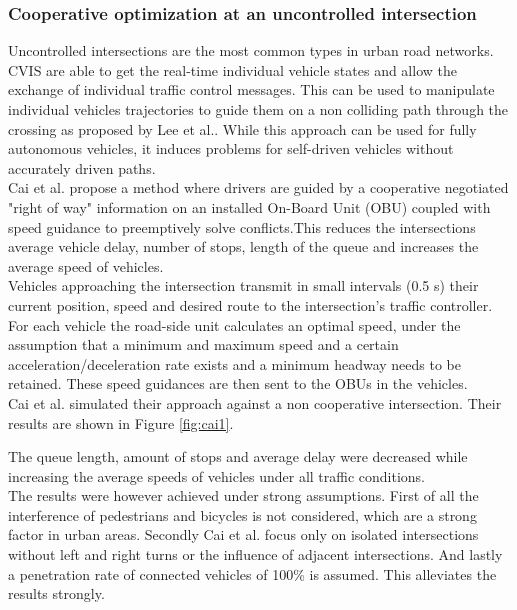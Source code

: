 \documentclass{sig-alternate}
\begin{document}
\subsubsection{Cooperative optimization at an uncontrolled intersection}
\label{uncontrolled}
Uncontrolled intersections are the most common types in urban road networks. CVIS are able to get the real-time individual vehicle states and allow the exchange of individual traffic control messages. This can be used to manipulate individual vehicles trajectories to guide them on a non colliding path through the crossing as proposed by Lee et al.\cite{lee2012development}. While this approach can be used for fully autonomous vehicles, it induces problems for self-driven vehicles without accurately driven paths. \\
Cai et al.\cite{6957666} propose a method where drivers are guided by a cooperative negotiated "right of way" information on an installed On-Board Unit (OBU) coupled with speed guidance to preemptively solve conflicts.This reduces the intersections average vehicle delay, number of stops, length of the queue and increases the average speed of vehicles.\\
Vehicles approaching the intersection transmit in small intervals (0.5 s) their current position, speed and desired route to the intersection's traffic controller. For each vehicle the road-side unit calculates an optimal speed, under the assumption that a minimum and maximum speed and a certain acceleration/deceleration rate exists and a minimum headway needs to be retained. These speed guidances are then sent to the OBUs in the vehicles.\\ 
Cai et al. simulated their approach against a non cooperative intersection. Their results are shown in Figure \ref{fig:cai1}. 
\begin{figure*} 
\centering
{}
\caption{Unsignalized cooperative optimization simulation results}
\label{fig:cai1}
\end{figure*}
The queue length, amount of stops and average delay were decreased while increasing the average speeds of vehicles under all traffic conditions. \\
The results were however achieved under strong assumptions. First of all the interference of pedestrians and bicycles is not considered, which are a strong factor in urban areas. Secondly Cai et al. focus only on isolated intersections without left and right turns or the influence of adjacent intersections. And lastly a penetration rate of connected vehicles of 100\% is assumed. This alleviates the results strongly. \\ 
\end{document}
